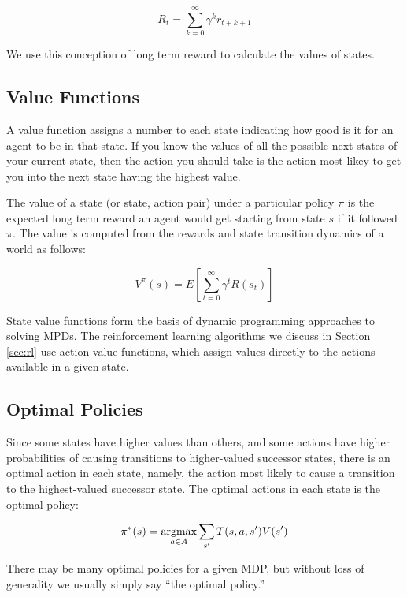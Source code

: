 \begin{equation}
R_t = \sum_{k=0}^{\infty} \gamma^k r_{t+k+1}
\end{equation}

We use this conception of long term reward to calculate the values of states.

\subsection{Value Functions}

A value function assigns a number to each state indicating how good is it for an agent to be in that state. If you know the values of all the possible next states of your current state, then the action you should take is the action most likey to get you into the next state having the highest value.

The value of a state (or state, action pair) under a particular policy $\pi$ is the expected long term reward an agent would get starting from state $s$ if it followed $\pi$. The value is computed from the rewards and state transition dynamics of a world as follows:

\begin{equation}
V^\pi(s) = E \left [ \sum_{t=0}^{\infty} \gamma^t R(s_t) \right ]
\end{equation}

State value functions form the basis of dynamic programming approaches to solving MPDs. The reinforcement learning algorithms we discuss in Section \ref{sec:rl} use action value functions, which assign values directly to the actions available in a given state.

\subsection{Optimal Policies}

Since some states have higher values than others, and some actions have higher probabilities of causing transitions to higher-valued successor states, there is an optimal action in each state, namely, the action most likely to cause a transition to the highest-valued successor state. The optimal actions in each state is the optimal policy:

\begin{equation}
\pi^*(s) = \operatorname*{argmax}_{a \in A} \sum_{s'} T(s, a, s') V(s')
\end{equation}

There may be many optimal policies for a given MDP, but without loss of generality we usually simply say ``the optimal policy.''

